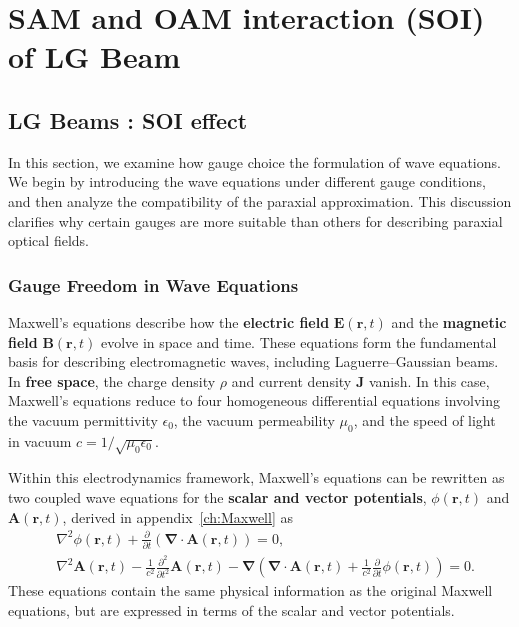 \chapter{SAM and OAM interaction (SOI) of LG Beam}
\label{ch:Theory}
\section{LG Beams : SOI effect}


In this section, we examine how gauge choice  the formulation of wave equations. We begin by introducing the wave equations under different gauge conditions, and then analyze the compatibility of the paraxial approximation. This discussion clarifies why certain gauges are more suitable than others for describing paraxial optical fields.

\subsection{Gauge Freedom in Wave Equations}

Maxwell's equations describe how the \textbf{electric field} $\boldsymbol{E}(\boldsymbol{r}, t)$ and the \textbf{magnetic field} $\boldsymbol{B}(\boldsymbol{r}, t)$ evolve in space and time. These equations form the fundamental basis for describing electromagnetic waves, including Laguerre--Gaussian beams. In \textbf{free space}, the charge density $\rho$ and current density $\mathbf{J}$ vanish. In this case, Maxwell's equations reduce to four homogeneous differential equations involving the vacuum permittivity $\epsilon_0$, the vacuum permeability $\mu_0$, and the speed of light in vacuum $c=1/\sqrt{\mu_0\epsilon_0}$. 

Within this electrodynamics framework, Maxwell's equations can be rewritten as two coupled wave equations for the \textbf{scalar and vector potentials}, $\phi(\boldsymbol{r}, t)$ and $\boldsymbol{A}(\boldsymbol{r}, t)$, derived in appendix~\ref{ch:Maxwell} as
\begin{align} 
&\nabla^2\phi(\boldsymbol{r}, t)+\frac{\partial }{\partial t}\left(\boldsymbol{\nabla}\cdot\boldsymbol{A}(\boldsymbol{r}, t)\right)=0, \label{max5} \\
&\nabla^2\boldsymbol{A}(\boldsymbol{r}, t)-\frac{1}{c^2}\frac{\partial^2 }{\partial t^2}\boldsymbol{A}(\boldsymbol{r}, t)-\boldsymbol{\nabla}\left(\boldsymbol{\nabla}\cdot\boldsymbol{A}(\boldsymbol{r}, t)+\frac{1}{c^2}\frac{\partial }{\partial t}\phi(\boldsymbol{r}, t)\right)=0. \label{max6}
\end{align}
These equations contain the same physical information as the original Maxwell equations, but are expressed in terms of the scalar and vector potentials.


